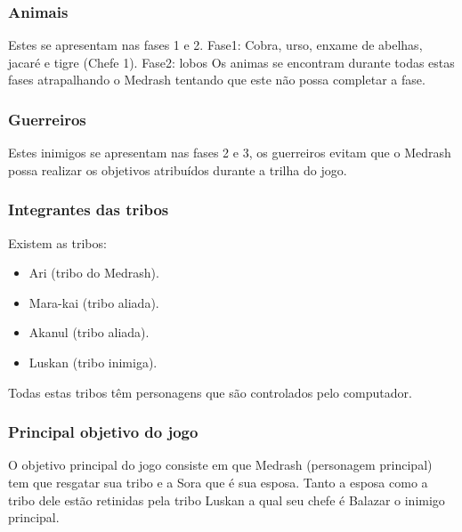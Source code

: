 \subsubsection{Animais}
Estes se apresentam nas fases 1 e 2.
Fase1: Cobra, urso, enxame de abelhas, jacaré e tigre (Chefe 1).
Fase2: lobos
Os animas se encontram durante todas estas fases atrapalhando o Medrash tentando
que este não possa completar a fase. 

\subsubsection{Guerreiros}
Estes inimigos se apresentam nas fases 2 e 3, os guerreiros evitam que o Medrash 
possa realizar os objetivos atribuídos durante a trilha do jogo. 

\subsubsection{Integrantes das tribos}
Existem as tribos:
\begin{itemize}
\item Ari (tribo do Medrash).
\item Mara-kai (tribo aliada).
\item Akanul (tribo aliada).
\item Luskan (tribo inimiga).
\end{itemize}
Todas estas tribos têm personagens que são controlados pelo computador.

\subsubsection{Principal objetivo do jogo}
O objetivo principal do jogo consiste em que Medrash (personagem principal) tem
 que resgatar sua tribo e a Sora que é sua esposa. Tanto a esposa como a tribo dele
 estão retinidas pela tribo Luskan a qual seu chefe é Balazar o inimigo principal. 
